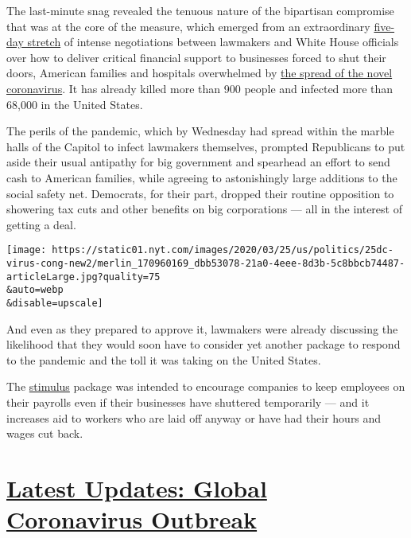 The last-minute snag revealed the tenuous nature of the bipartisan
compromise that was at the core of the measure, which emerged from an
extraordinary
\href{https://www.nytimes.com/2020/03/19/us/politics/1000-checks-coronavirus-stimulus.html}{five-day
stretch} of intense negotiations between lawmakers and White House
officials over how to deliver critical financial support to businesses
forced to shut their doors, American families and hospitals overwhelmed
by
\href{https://www.nytimes.com/interactive/2020/world/coronavirus-maps.html?action=click\&pgtype=Article\&state=default\&module=styln-coronavirus-markets\&variant=show\&region=TOP_BANNER\&context=storyline_menu?action=click\&pgtype=Article\&state=default\&module=styln-coronavirus-markets\&variant=show\&region=TOP_BANNER\&context=storyline_menu\#us}{the
spread of the novel coronavirus}. It has already killed more than 900
people and infected more than 68,000 in the United States.

The perils of the pandemic, which by Wednesday had spread within the
marble halls of the Capitol to infect lawmakers themselves, prompted
Republicans to put aside their usual antipathy for big government and
spearhead an effort to send cash to American families, while agreeing to
astonishingly large additions to the social safety net. Democrats, for
their part, dropped their routine opposition to showering tax cuts and
other benefits on big corporations --- all in the interest of getting a
deal.

\texttt{[image: https://static01.nyt.com/images/2020/03/25/us/politics/25dc-virus-cong-new2/merlin\_170960169\_dbb53078-21a0-4eee-8d3b-5c8bbcb74487-articleLarge.jpg?quality=75\\\&auto=webp\\\&disable=upscale]}

And even as they prepared to approve it, lawmakers were already
discussing the likelihood that they would soon have to consider yet
another package to respond to the pandemic and the toll it was taking on
the United States.

The
\href{https://www.nytimes.com/article/where-is-my-stimulus-payment.html}{stimulus}
package was intended to encourage companies to keep employees on their
payrolls even if their businesses have shuttered temporarily --- and it
increases aid to workers who are laid off anyway or have had their hours
and wages cut back.

\hypertarget{latest-updates-global-coronavirus-outbreak}{%
\section{\texorpdfstring{\href{https://www.nytimes.com/2020/08/01/world/coronavirus-covid-19.html?action=click\&pgtype=Article\&state=default\&region=MAIN_CONTENT_1\&context=storylines_live_updates}{Latest
Updates: Global Coronavirus
Outbreak}}{Latest Updates: Global Coronavirus Outbreak}}\label{latest-updates-global-coronavirus-outbreak}}

